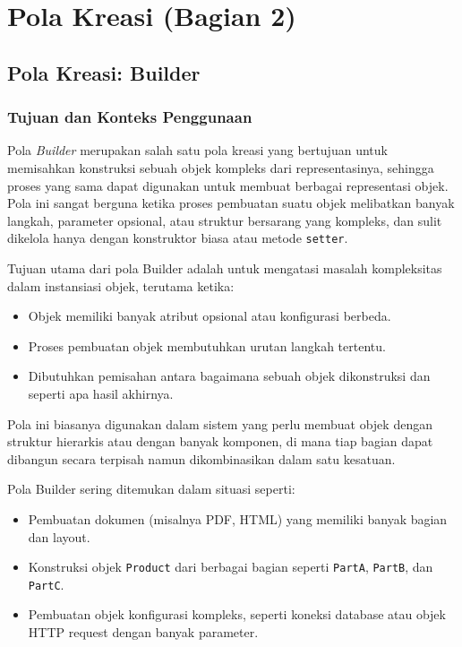 \chapter{Pola Kreasi (Bagian 2)}

\section{Pola Kreasi: Builder}

\subsection{Tujuan dan Konteks Penggunaan}

Pola \textit{Builder} merupakan salah satu pola kreasi yang bertujuan untuk memisahkan konstruksi sebuah objek kompleks dari representasinya, sehingga proses yang sama dapat digunakan untuk membuat berbagai representasi objek. Pola ini sangat berguna ketika proses pembuatan suatu objek melibatkan banyak langkah, parameter opsional, atau struktur bersarang yang kompleks, dan sulit dikelola hanya dengan konstruktor biasa atau metode \texttt{setter}.

Tujuan utama dari pola Builder adalah untuk mengatasi masalah kompleksitas dalam instansiasi objek, terutama ketika:
\begin{itemize}
\item Objek memiliki banyak atribut opsional atau konfigurasi berbeda.
\item Proses pembuatan objek membutuhkan urutan langkah tertentu.
\item Dibutuhkan pemisahan antara bagaimana sebuah objek dikonstruksi dan seperti apa hasil akhirnya.
\end{itemize}

Pola ini biasanya digunakan dalam sistem yang perlu membuat objek dengan struktur hierarkis atau dengan banyak komponen, di mana tiap bagian dapat dibangun secara terpisah namun dikombinasikan dalam satu kesatuan.

Pola Builder sering ditemukan dalam situasi seperti:
\begin{itemize}
\item Pembuatan dokumen (misalnya PDF, HTML) yang memiliki banyak bagian dan layout.
\item Konstruksi objek \texttt{Product} dari berbagai bagian seperti \texttt{PartA}, \texttt{PartB}, dan \texttt{PartC}.
\item Pembuatan objek konfigurasi kompleks, seperti koneksi database atau objek HTTP request dengan banyak parameter.
\end{itemize}

